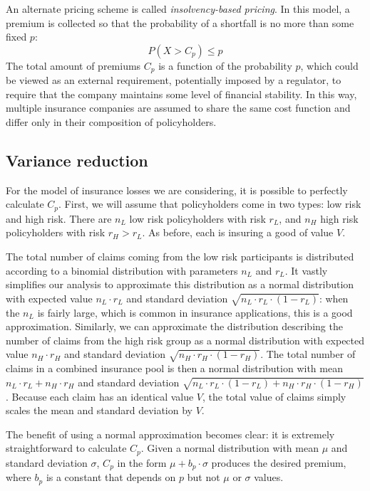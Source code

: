 \documentclass[sigconf]{acmart}
\newcommand{\nL}[0]{\ensuremath{n_L}}
\newcommand{\nH}[0]{\ensuremath{n_H}}
\newcommand{\rL}[0]{\ensuremath{r_L}}
\newcommand{\rH}[0]{\ensuremath{r_H}}
\newcommand{\V}[0]{\ensuremath{V}}
\newcommand{\cd}[0]{\cdot}
\begin{document}
An alternate pricing scheme is called \emph{insolvency-based pricing}. In this model, a premium is collected so that the probability of a shortfall is no more than some fixed $p$: 
$$P(X > C_p) \leq p$$
The total amount of premiums $C_p$ is a function of the probability $p$, which could be viewed as an external requirement, potentially imposed by a regulator, to require that the company maintains some level of financial stability. In this way, multiple insurance companies are assumed to share the same cost function and differ only in their composition of policyholders. 

\subsection{Variance reduction}
For the model of insurance losses we are considering, it is possible to perfectly calculate $C_p$. First, we will assume that policyholders come in two types: low risk and high risk. There are $\nL$ low risk policyholders with risk $\rL$, and $\nH$ high risk policyholders with risk $\rH>\rL$. As before, each is insuring a good of value $V$. 

The total number of claims coming from the low risk participants is distributed according to a binomial distribution with parameters $\nL$ and $\rL$. It vastly simplifies our analysis to approximate this distribution as a normal distribution with expected value $\nL \cd \rL$ and standard deviation $\sqrt{\nL \cd \rL \cd (1-\rL)}$: when the $\nL$ is fairly large, which is common in insurance applications, this is a good approximation.  Similarly, we can approximate the distribution describing the number of claims from the high risk group as a normal distribution with expected value $\nH \cd \rH$ and standard deviation $\sqrt{\nH \cd \rH \cd (1-\rH)}$. The total number of claims in a combined insurance pool is then a normal distribution with mean $\nL \cd \rL +\nH \cd \rH$ and standard deviation $\sqrt{\nL \cd \rL \cd (1-\rL) + \nH \cd \rH \cd (1-\rH)}$. Because each claim has an identical value $\V$, the total value of claims simply scales the mean and standard deviation by $\V$. 

The benefit of using a normal approximation becomes clear: it is extremely straightforward to calculate $C_p$. Given a normal distribution with mean $\mu$ and standard deviation $\sigma$, $C_p$ in the form $\mu + b_p \cd \sigma$ produces the desired premium, where $b_p$ is a constant that depends on $p$ but not $\mu$ or $\sigma$ values. 
\end{document}
